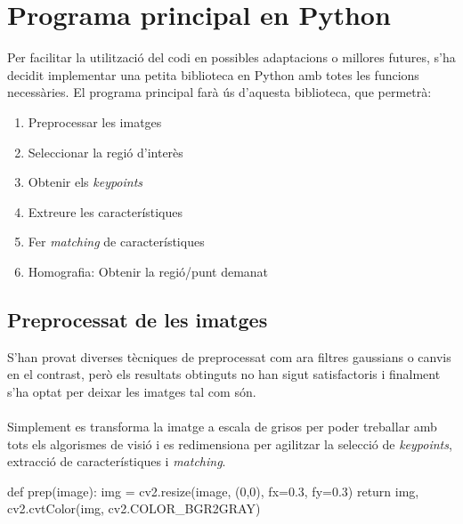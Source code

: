 \section{Programa principal en Python}
	Per facilitar la utilització del codi en possibles adaptacions o millores futures, s'ha decidit implementar una petita biblioteca en Python amb totes les funcions necessàries. El programa principal farà ús
	d'aquesta biblioteca, que permetrà:

	\begin{enumerate}
		\item{Preprocessar les imatges}
		\item{Seleccionar la regió d'interès}
		\item{Obtenir els \textit{keypoints}}
		\item{Extreure les característiques}
		\item{Fer \textit{matching} de característiques}
		\item{Homografia: Obtenir la regió/punt demanat}
	\end{enumerate}

	\subsection{Preprocessat de les imatges}
		S'han provat diverses tècniques de preprocessat com ara filtres gaussians o canvis en el contrast, però els resultats obtinguts no han sigut satisfactoris i finalment s'ha optat per deixar
		les imatges tal com són.\\\\
		Simplement es transforma la imatge a escala de grisos per poder treballar amb tots els algorismes de visió i es redimensiona per agilitzar la selecció de \textit{keypoints}, extracció
		de característiques i \textit{matching}.\\
		\begin{python}
def prep(image):
	img = cv2.resize(image, (0,0), fx=0.3, fy=0.3)
	return img, cv2.cvtColor(img, cv2.COLOR_BGR2GRAY)
		\end{python}
